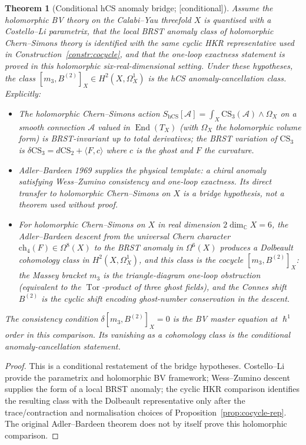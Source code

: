 \documentclass[11pt,reqno]{amsart}
\theoremstyle{plain}
\newtheorem{theorem}{Theorem}[section]
\theoremstyle{definition}
\theoremstyle{remark}
\providecommand{\ClaimStatusConditional}{\textnormal{[conditional]}}
\DeclareMathOperator{\End}{End}
\DeclareMathOperator{\Tor}{Tor}
\newcommand{\Cbb}{\mathbb{C}}
\newcommand{\cA}{\mathcal{A}}
\newcommand{\hbar}{{\hslash}}
\begin{document}
\begin{theorem}[Conditional hCS anomaly bridge; \ClaimStatusConditional]
\label{thm:adler-bardeen}
Assume the holomorphic BV theory on the Calabi--Yau threefold $X$ is
quantised with a Costello--Li parametrix, that the local BRST anomaly
class of holomorphic Chern--Simons theory is identified with the same
cyclic HKR representative used in Construction~\ref{constr:cocycle},
and that the one-loop exactness statement is proved in this holomorphic
six-real-dimensional setting. Under these hypotheses, the class
$[m_3,B^{(2)}]_X\in H^2(X,\Omega^1_X)$ is the hCS anomaly-cancellation
class. Explicitly:
\begin{itemize}
  \item The holomorphic Chern--Simons action $S_{\mathrm{hCS}}[\cA] = \int_X \mathrm{CS}_3(\cA) \wedge \Omega_X$ on a smooth connection $\cA$ valued in $\End(T_X)$ (with $\Omega_X$ the holomorphic volume form) is BRST-invariant up to total derivatives; the BRST variation of $\mathrm{CS}_3$ is $\delta \mathrm{CS}_3 = d \mathrm{CS}_2 + \langle F, c \rangle$ where $c$ is the ghost and $F$ the curvature.
  \item Adler--Bardeen 1969 supplies the physical template: a chiral anomaly satisfying Wess--Zumino consistency and one-loop exactness. Its direct transfer to holomorphic Chern--Simons on $X$ is a bridge hypothesis, not a theorem used without proof.
  \item For holomorphic Chern--Simons on $X$ in real dimension $2 \dim_\Cbb X = 6$, the Adler--Bardeen descent from the universal Chern character $\mathrm{ch}_4(F) \in \Omega^{8}(X)$ to the BRST anomaly in $\Omega^6(X)$ produces a Dolbeault cohomology class in $H^2(X, \Omega^1_X)$, and this class is the cocycle $[m_3, B^{(2)}]_X$: the Massey bracket $m_3$ is the triangle-diagram one-loop obstruction (equivalent to the $\Tor$-product of three ghost fields), and the Connes shift $B^{(2)}$ is the cyclic shift encoding ghost-number conservation in the descent.
\end{itemize}
The consistency condition $\delta [m_3, B^{(2)}]_X = 0$ is the BV master equation at $\hbar^1$ order in this comparison. Its vanishing as a cohomology class is the conditional anomaly-cancellation statement.
\end{theorem}

\begin{proof}
This is a conditional restatement of the bridge hypotheses. Costello--Li
provide the parametrix and holomorphic BV framework; Wess--Zumino
descent supplies the form of a local BRST anomaly; the cyclic HKR
comparison identifies the resulting class with the Dolbeault
representative only after the trace/contraction and normalisation
choices of Proposition~\ref{prop:cocycle-rep}. The original
Adler--Bardeen theorem does not by itself prove this holomorphic
comparison.
\end{proof}
\end{document}
